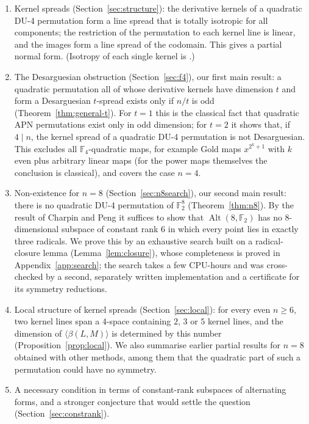 \documentclass[11pt]{article}
\theoremstyle{definition}
\newcommand{\F}{\mathbb{F}}
\DeclareMathOperator{\Alt}{Alt}
\begin{document}
\begin{enumerate}
\item Kernel spreads (Section~\ref{sec:structure}): the derivative kernels of a quadratic DU-4
permutation form a line spread that is totally isotropic for all components; the restriction
of the permutation to each kernel line is linear, and the images form a line spread of the
codomain. This gives a partial normal form. (Isotropy of each single kernel is \cite[Lemma~1]{MTX19}.)
\item The Desarguesian obstruction (Section~\ref{sec:f4}), our first main result: a quadratic
permutation all of whose derivative kernels have dimension $t$ and form a Desarguesian
$t$-spread exists only if $n/t$ is odd (Theorem~\ref{thm:general-t}). For $t=1$ this is the
classical fact that quadratic APN permutations exist only in odd dimension; for $t=2$ it shows
that, if $4\mid n$, the kernel spread of a quadratic DU-4 permutation is not Desarguesian. This
excludes all $\F_4$-quadratic maps, for example Gold maps $x^{2^k+1}$ with $k$ even plus
arbitrary linear maps (for the power maps themselves the conclusion is classical), and
covers the case $n=4$.
\item Non-existence for $n=8$ (Section~\ref{sec:n8search}), our second main result: there is no
quadratic DU-4 permutation of $\F_2^8$ (Theorem~\ref{thm:n8}). By the result of Charpin and
Peng it suffices to show that $\Alt(8,\F_2)$ has no $8$-dimensional subspace of constant rank
$6$ in which every point lies in exactly three radicals. We prove this by an exhaustive search
built on a radical-closure lemma (Lemma~\ref{lem:closure}), whose completeness is proved in
Appendix~\ref{app:search}; the search takes a few CPU-hours and was cross-checked by a second,
separately written implementation and a certificate for its symmetry reductions.
\item Local structure of kernel spreads (Section~\ref{sec:local}): for every even $n\ge6$, two kernel
lines span a $4$-space containing $2$, $3$ or $5$ kernel lines, and the dimension of
$\langle\beta(L,M)\rangle$ is determined by this number (Proposition~\ref{prop:local}). We also
summarise earlier partial results for $n=8$ obtained with other methods, among them that the
quadratic part of such a permutation could have no symmetry.
\item A necessary condition in terms of constant-rank subspaces of alternating forms, and a
stronger conjecture that would settle the question (Section~\ref{sec:constrank}).
\end{enumerate}
\end{document}
